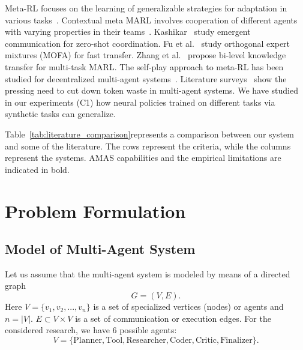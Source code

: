 \documentclass[conference]{IEEEtran}
\begin{document}
Meta-RL focuses on the learning of generalizable strategies for adaptation in various tasks~\cite{Huang2024AdaptiveMARL,Kashikar2025MetaRL}. Contextual meta MARL involves cooperation of different agents with varying properties in their teams~\cite{Huang2024AdaptiveMARL}. Kashikar~\cite{Kashikar2025MetaRL} study emergent communication for zero-shot coordination. Fu et al.~\cite{Fu2026MOFA} study orthogonal expert mixtures (MOFA) for fast transfer. Zhang et al.~\cite{zhang2025bilevel} propose bi-level knowledge transfer for multi-task MARL. The self-play approach to meta-RL has been studied for decentralized multi-agent systems~\cite{Mali2026SelfPlay,li2020adaptive}. Literature surveys~\cite{Cao2025TNNLSSurvey,sun2024llmmarl,lee2026survey} show the pressing need to cut down token waste in multi-agent systems. We have studied in our experiments (C1) how neural policies trained on different tasks via synthetic tasks can generalize.

Table~\ref{tab:literature_comparison}represents a comparison between our system and some of the literature. The rows represent the criteria, while the columns represent the systems. AMAS capabilities and the empirical limitations are indicated in bold.



\section{Problem Formulation}
\label{sec:problem_formulation}

\subsection{Model of Multi-Agent System}
Let us assume that the multi-agent system is modeled by means of a directed graph
\begin{equation}
G = (V, E).
\end{equation}
Here $V = \{v_1, v_2, ..., v_n\}$ is a set of specialized vertices (nodes) or agents and $n=|V|$. $E \subset V \times V$ is a set of communication or execution edges. For the considered research, we have 6 possible agents:
\begin{equation}
V = \{\text{Planner}, \text{Tool}, \text{Researcher}, \text{Coder}, \text{Critic}, \text{Finalizer}\}.
\end{equation}
\end{document}
